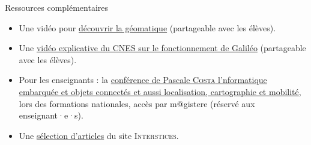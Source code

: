\begin{gofurther}{Ressources complémentaires}
\begin{itemize}\jazzitem
\item Une vidéo pour \href{https://pixees.fr/marier-geographie-et-informatique/}{découvrir la géomatique} (partageable avec les élèves).
\item Une \href{https://jeunes.cnes.fr/fr/tu-pris-ton-galileo}{vidéo explicative du CNES sur le fonctionnement de Galiléo}  (partageable avec les élèves).
\item Pour les enseignants : la \href{https://magistere.education.fr/dgesco/}{conférence de Pascale \textsc{Costa} l'nformatique embarquée et objets connectés et aussi localisation, cartographie et mobilité}, lors des formations nationales, accès par m@gistere (réservé aux enseignant·e·s).
\item Une \href{https://interstices.info/dossier/snt-localisation-cartographie-et-mobilite/}{sélection d'articles} du site \textsc{Interstices}.
\end{itemize}


\end{gofurther}
